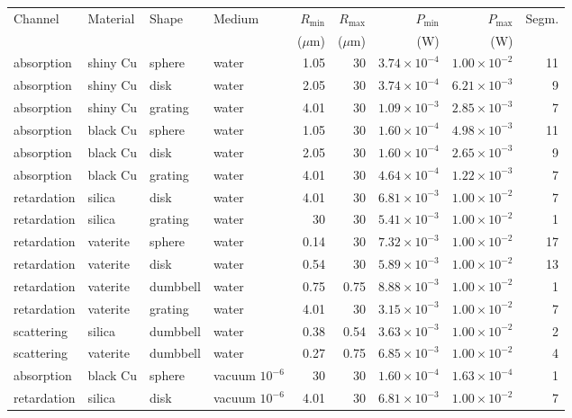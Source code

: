 \begin{tabular}{|l|l|l|l|r|r|r|r|r|}
\hline
Channel & Material & Shape & Medium & $R_{\min}$ & $R_{\max}$ & $P_{\min}$ & $P_{\max}$ & Segm. \\
 & & & & ($\mu$m) & ($\mu$m) & (W) & (W) & \\
\hline
absorption & shiny Cu & sphere & water & 1.05 & 30 & $3.74\times10^{-4}$ & $1.00\times10^{-2}$ & 11 \\
absorption & shiny Cu & disk & water & 2.05 & 30 & $3.74\times10^{-4}$ & $6.21\times10^{-3}$ & 9 \\
absorption & shiny Cu & grating & water & 4.01 & 30 & $1.09\times10^{-3}$ & $2.85\times10^{-3}$ & 7 \\
absorption & black Cu & sphere & water & 1.05 & 30 & $1.60\times10^{-4}$ & $4.98\times10^{-3}$ & 11 \\
absorption & black Cu & disk & water & 2.05 & 30 & $1.60\times10^{-4}$ & $2.65\times10^{-3}$ & 9 \\
absorption & black Cu & grating & water & 4.01 & 30 & $4.64\times10^{-4}$ & $1.22\times10^{-3}$ & 7 \\
retardation & silica & disk & water & 4.01 & 30 & $6.81\times10^{-3}$ & $1.00\times10^{-2}$ & 7 \\
retardation & silica & grating & water & 30 & 30 & $5.41\times10^{-3}$ & $1.00\times10^{-2}$ & 1 \\
retardation & vaterite & sphere & water & 0.14 & 30 & $7.32\times10^{-3}$ & $1.00\times10^{-2}$ & 17 \\
retardation & vaterite & disk & water & 0.54 & 30 & $5.89\times10^{-3}$ & $1.00\times10^{-2}$ & 13 \\
retardation & vaterite & dumbbell & water & 0.75 & 0.75 & $8.88\times10^{-3}$ & $1.00\times10^{-2}$ & 1 \\
retardation & vaterite & grating & water & 4.01 & 30 & $3.15\times10^{-3}$ & $1.00\times10^{-2}$ & 7 \\
scattering & silica & dumbbell & water & 0.38 & 0.54 & $3.63\times10^{-3}$ & $1.00\times10^{-2}$ & 2 \\
scattering & vaterite & dumbbell & water & 0.27 & 0.75 & $6.85\times10^{-3}$ & $1.00\times10^{-2}$ & 4 \\
\hline
absorption & black Cu & sphere & vacuum $10^{-6}$ & 30 & 30 & $1.60\times10^{-4}$ & $1.63\times10^{-4}$ & 1 \\
retardation & silica & disk & vacuum $10^{-6}$ & 4.01 & 30 & $6.81\times10^{-3}$ & $1.00\times10^{-2}$ & 7 \\

\end{tabular}
